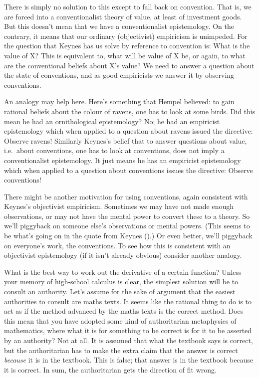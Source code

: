 \documentclass[
  10pt,
  letterpaper,
  DIV=11,
  numbers=noendperiod,
  twoside]{scrartcl}
\begin{document}
There is simply no solution to this except to fall back on convention.
That is, we are forced into a conventionalist theory of value, at least
of investment goods. But this doesn't mean that we have a
conventionalist epistemology. On the contrary, it means that our
ordinary (objectivist) empiricism is unimpeded. For the question that
Keynes has us solve by reference to convention is: What is the value of
X? This is equivalent to, what will be value of X be, or again, to what
are the conventional beliefs about X's value? We need to answer a
question about the state of conventions, and as good empiricists we
answer it by observing conventions.

An analogy may help here. Here's something that Hempel believed: to gain
rational beliefs about the colour of ravens, one has to look at some
birds. Did this mean he had an ornithological epistemology? No; he had
an empiricist epistemology which when applied to a question about ravens
issued the directive: Observe ravens! Similarly Keynes's belief that to
answer questions about value, i.e.~about conventions, one has to look at
conventions, does not imply a conventionalist epistemology. It just
means he has an empiricist epistemology which when applied to a question
about conventions issues the directive: Observe conventions!

There might be another motivation for using conventions, again
consistent with Keynes's objectivist empiricism. Sometimes we may have
not made enough observations, or may not have the mental power to
convert these to a theory. So we'll piggyback on someone else's
observations or mental powers. (This seems to be what's going on in the
quote from Keynes ().) Or even better,
we'll piggyback on everyone's work, the conventions. To see how this is
consistent with an objectivist epistemology (if it isn't already
obvious) consider another analogy.

What is the best way to work out the derivative of a certain function?
Unless your memory of high-school calculus is clear, the simplest
solution will be to consult an authority. Let's assume for the sake of
argument that the easiest authorities to consult are maths texts. It
seems like the rational thing to do is to act as if the method advanced
by the maths texts is the correct method. Does this mean that you have
adopted some kind of authoritarian metaphysics of mathematics, where
what it is for something to be correct is for it to be asserted by an
authority? Not at all. It is assumed that what the textbook says is
correct, but the authoritarian has to make the extra claim that the
answer is correct \emph{because} it is in the textbook. This is false;
that answer is in the textbook because it is correct. In sum, the
authoritarian gets the direction of fit wrong.
\end{document}
